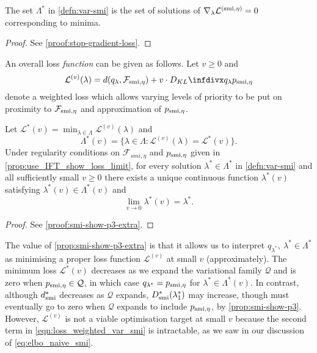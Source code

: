 \begin{proposition}\label{prop:stop-gradient-loss}
  The set $\Lambda^*$ in \cref{defn:var-smi} is the set of solutions of $\nabla_{\lambda} \mathcal{L}^{( \operatorname{\text{smi}}, \eta)} = 0$ corresponding to minima.
\end{proposition}
\begin{proof}
  See \cref{proof:stop-gradient-loss}.
\end{proof}

An overall loss \emph{function} can be given as follows. Let $v\ge 0$ and
\begin{equation}\label{eqn:loss_weighted_var_smi}
  \mathcal{L}^{(v)}(\lambda)=d(q_\lambda,\mathcal{F}_{\smi,\eta})+
  v\cdot \kl{q_{\lambda}}{p_{ \smi, \eta}}
\end{equation}
denote a weighted loss which allows varying levels of priority to be put on proximity to $\mathcal{F}_{\operatorname{\text{smi}},\eta}$ and approximation of $p_{ \operatorname{\text{smi}}, \eta}$.
\begin{proposition} \label{prop:smi-show-p3-extra}
  Let $\mathcal{L}^*(v)=\min_{\lambda\in\Lambda}\mathcal{L}^{(v)}(\lambda)$
  and
  \[
    \Lambda^*(v)=\{\lambda\in \Lambda: \mathcal{L}^{(v)}(\lambda)=\mathcal{L}^*(v)\}.
  \]
  Under regularity conditions on $\mathcal{F}_{smi,\eta}$ and $p_{ \operatorname{\text{smi}}, \eta}$ given in \cref{prop:use_IFT_show_loss_limit}, for every solution $\lambda^*\in \Lambda^*$ in \cref{defn:var-smi} and all sufficiently small $v\ge 0$ there exists a unique continuous function $\lambda^*(v)$ satisfying $\lambda^*(v)\in \Lambda^*(v)$ and \[\lim_{v\to 0}\lambda^*(v)=\lambda^*.\]
\end{proposition}
\begin{proof}
  See \cref{proof:smi-show-p3-extra}.
\end{proof}


The value of \cref{prop:smi-show-p3-extra} is that it allows us to interpret $q_{\lambda^*},\ \lambda^*\in\Lambda^*$ as minimising a proper loss function $\mathcal{L}^{(v)}$ at small $v$ (approximately). The minimum loss $\mathcal{L}^*(v)$ decreases as we expand the variational family $\mathcal{Q}$ and is zero when $p_{ \operatorname{\text{smi}}, \eta}\in\mathcal{Q}$, in which case $q_{\lambda^*}=p_{ \operatorname{\text{smi}}, \eta}$ for $\lambda^*\in \Lambda^*(v)$. In contrast, although $d^*_{\operatorname{\text{smi}}}$ decreases as $\mathcal{Q}$ expands, $D^*_{\operatorname{\text{smi}}}(\lambda_1^*)$ may increase, though must eventually go to zero when $\mathcal{Q}$ expands to include $p_{ \operatorname{\text{smi}}, \eta}$, by \cref{prop:smi-show-p3}. However, $\mathcal{L}^{(v)}$ is not a viable optimisation target at small $v$ because the second term in \cref{eqn:loss_weighted_var_smi} is intractable, as we saw in our discussion of \cref{eq:elbo_naive_smi}.

